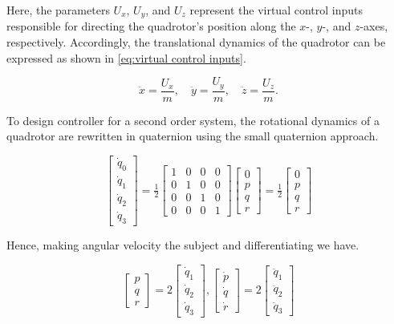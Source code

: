 \begin{small}
Here, the parameters $U_x$, $U_y$, and $U_z$ represent the virtual control inputs responsible 
for directing the quadrotor’s position along the $x$-, $y$-, and $z$-axes, respectively. 
Accordingly, the translational dynamics of the quadrotor can be expressed as shown in 
\eqref{eq:virtual control inputs}.


\begin{equation}
\ddot{x} = \frac{U_x}{m}, \quad 
\ddot{y} = \frac{U_y}{m}, \quad 
\ddot{z} = \frac{U_z}{m}.
\label{eq:simplified translation dynamics}
\end{equation}


To design controller for a second order system, the rotational dynamics of a quadrotor are 
rewritten in quaternion using the small quaternion approach.

\begin{equation}
\begin{bmatrix}
\dot{q}_0 \\ \dot{q}_1 \\ \dot{q}_2 \\ \dot{q}_3
\end{bmatrix}
= \tfrac{1}{2}
\begin{bmatrix}
1 & 0 & 0 & 0 \\
0 & 1 & 0 & 0 \\
0 & 0 & 1 & 0 \\
0 & 0 & 0 & 1
\end{bmatrix}
\begin{bmatrix}
0 \\ p \\ q \\ r
\end{bmatrix}
= \tfrac{1}{2}
\begin{bmatrix}
0 \\ p \\ q \\ r
\end{bmatrix} 
\end{equation}



Hence, making angular velocity the subject and differentiating we have.

\begin{equation}
\begin{bmatrix}
p \\ q \\ r
\end{bmatrix}
= 2
\begin{bmatrix}
\dot{q}_1 \\ \dot{q}_2 \\ \dot{q}_3
\end{bmatrix}, \begin{bmatrix}
\dot{p} \\ \dot{q} \\ \dot{r}
\end{bmatrix}
= 2
\begin{bmatrix}
\ddot{q}_1 \\ \ddot{q}_2 \\ \ddot{q}_3
\end{bmatrix}
\end{equation}


\end{small}
